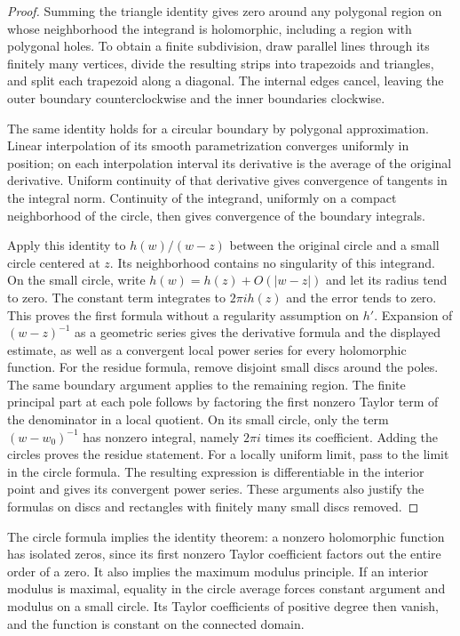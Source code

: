 \begin{proof}
Summing the triangle identity gives zero around any polygonal region
on whose neighborhood the integrand is holomorphic, including a region
with polygonal holes.  To obtain a finite subdivision, draw parallel
lines through its finitely many vertices, divide the resulting strips
into trapezoids and triangles, and split each trapezoid along a diagonal.
The internal edges cancel, leaving the outer boundary counterclockwise
and the inner boundaries clockwise.

The same identity holds for a circular boundary by polygonal
approximation.  Linear interpolation of its smooth parametrization
converges uniformly in position; on each interpolation interval its
derivative is the average of the original derivative.  Uniform continuity
of that derivative gives convergence of tangents in the integral norm.
Continuity of the integrand, uniformly on a compact neighborhood of the
circle, then gives convergence of the boundary integrals.

Apply this identity to $h(w)/(w-z)$ between the original circle and a
small circle centered at $z$.  Its neighborhood contains no singularity
of this integrand.  On the small circle, write
$h(w)=h(z)+O(|w-z|)$ and let its radius tend to zero.
The constant term integrates to $2\pi i h(z)$ and the error tends to zero.
This proves the first formula without a regularity assumption on $h'$.
Expansion of $(w-z)^{-1}$ as a geometric series gives the derivative formula
and the displayed estimate, as well as a convergent local power series
for every holomorphic function.
For the residue formula, remove disjoint small discs around the poles.
The same boundary argument applies to the remaining region.
The finite principal part at each pole follows by factoring the first
nonzero Taylor term of the denominator in a local quotient.
On its small circle, only the term $(w-w_0)^{-1}$ has nonzero integral,
namely $2\pi i$ times its coefficient.  Adding the circles proves the
residue statement.
For a locally uniform limit, pass to the limit in the circle formula.
The resulting expression is differentiable in the interior point and gives
its convergent power series.  These arguments also justify the formulas
on discs and rectangles with finitely many small discs removed.
\end{proof}

The circle formula implies the identity theorem: a nonzero holomorphic
function has isolated zeros, since its first nonzero Taylor coefficient
factors out the entire order of a zero.  It also implies the maximum
modulus principle.  If an interior modulus is maximal, equality in the
circle average forces constant argument and modulus on a small circle.
Its Taylor coefficients of positive degree then vanish, and the function
is constant on the connected domain.

